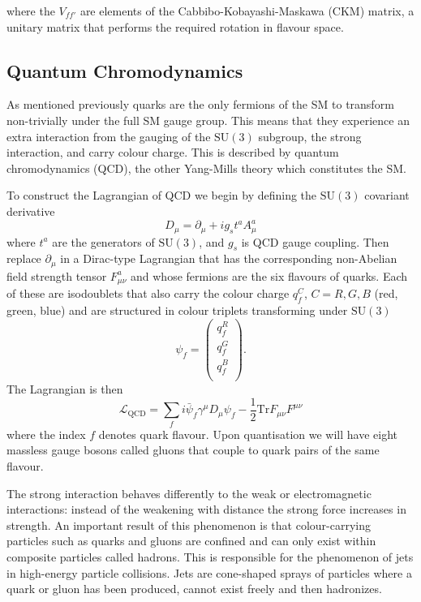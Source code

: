 where the $V_{ff'}$ are elements of the Cabbibo-Kobayashi-Maskawa (CKM) matrix, a unitary matrix that performs the required rotation in flavour space.

\subsection{Quantum Chromodynamics}
As mentioned previously quarks are the only fermions of the SM to transform non-trivially under the full SM gauge group. This means that they experience an extra interaction from the gauging of the $\mathrm{SU}(3)$ subgroup, the strong interaction, and carry colour charge. This is described by quantum chromodynamics (QCD), the other Yang-Mills theory which constitutes the SM. 

To construct the Lagrangian of QCD we begin by defining the $\mathrm{SU}(3)$ covariant derivative
\begin{equation}
    D_{\mu} = \partial_{\mu} + ig_{s}t^{a}A^{a}_{\mu}
\end{equation}
where $t^{a}$ are the generators of $\mathrm{SU}(3)$, and $g_{s}$ is QCD gauge coupling. Then replace $\partial_{\mu}$ in a Dirac-type Lagrangian that has the corresponding non-Abelian field strength tensor $F^{a}_{\mu\nu}$ and whose fermions are the six flavours of quarks. 
Each of these are isodoublets that also carry the colour charge $q^{C}_{f}$, $C=R,G,B$ (red, green, blue) and are structured in colour triplets transforming under $\mathrm{SU}(3)$
\begin{equation}
    \psi_{f} = \begin{pmatrix}
        q_{f}^{R} \\
        q_{f}^{G} \\
        q_{f}^{B} \\
    \end{pmatrix}.
\end{equation}
The Lagrangian is then
\begin{equation}
    \mathcal{L}_{\mathrm{QCD}} = \sum_{f}i\bar{\psi}_{f}\gamma^{\mu}D_{\mu}\psi_{f} - \frac{1}{2}\mathrm{Tr}F_{\mu\nu}F^{\mu\nu}
\end{equation}
where the index $f$ denotes quark flavour. Upon quantisation we will have eight massless gauge bosons called gluons that couple to quark pairs of the same flavour. 

The strong interaction behaves differently to the weak or electromagnetic interactions: instead of the weakening with distance the strong force increases in strength. An important result of this phenomenon is that colour-carrying particles such as quarks and gluons are confined and can only exist within composite particles called hadrons. This is responsible for the phenomenon of jets in high-energy particle collisions. Jets are cone-shaped sprays of particles where a quark or gluon has been produced, cannot exist freely and then hadronizes. 

